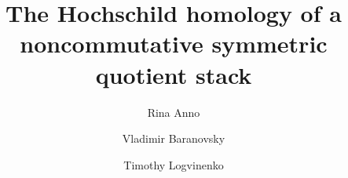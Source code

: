 \documentclass[12pt,a4paper,reqno]{amsart}
\title[Hochschild homology of nc symmetric quotient stack]{The Hochschild homology of a noncommutative symmetric quotient stack}
\author{Rina Anno}
\author{Vladimir Baranovsky}
\author{Timothy Logvinenko}
\DeclareMathOperator{\picr}{Pic}
\DeclareMathOperator{\cl}{Cl}
\DeclareMathOperator{\modd}{\bf Mod}
\DeclareMathOperator{\opp}{{opp}}
\begin{document}
\def\bv{\mathbf{v}}
\def\kgc_{K^*_G(\mathbb{C}^n)}
\def\kgchi_{K^*_\chi(\mathbb{C}^n)}
\def\kgcf_{K_G(\mathbb{C}^n)}
\def\kgchif_{K_\chi(\mathbb{C}^n)}
\def\gpic_{G\text{-}\picr}
\def\gcl_{G\text{-}\cl}
\def\trch_{{\chi_{0}}}
\def\regring{{R}}
\def\regrep{{V_{\text{reg}}}}
\def\givrep{{V_{\text{giv}}}}
\def\lbar{{(\mathbb{Z}^n)^\vee}}
\def\genpx_{{p_X}}
\def\genpy_{{p_Y}}
\def\genpcn_{p_{\mathbb{C}^n}}
\def\gnat{gnat}
\def\twalg{{\regring \rtimes G}}
\def\L{{\mathcal{L}}}
\def\gcd{\mbox{gcd}}
\def\lcm{\mbox{lcm}}
\def\tf{{\tilde{f}}}
\def\tD{{\tilde{D}}}
\def\A{{\mathcal{A}}}
\def\B{{\mathcal{B}}}
\def\C{{\mathcal{C}}}
\def\D{{\mathcal{D}}}
\def\F{{\mathcal{F}}}
\def\H{{\mathcal{H}}}
\def\L{{\mathcal{L}}}
\def\M{{\mathcal{M}}}
\def\N{{\mathcal{N}}}
\def\R{{\mathcal{R}}}
\def\T{{\mathcal{T}}}
\def\RF{{\mathcal{R}\mathcal{F}}}
\def\barA{{\bar{\mathcal{A}}}}
\def\barAi{{\bar{\mathcal{A}}_1}}
\def\barAj{{\bar{\mathcal{A}}_2}}
\def\barB{{\bar{\mathcal{B}}}}
\def\barC{{\bar{\mathcal{C}}}}
\def\barD{{\bar{\mathcal{D}}}}
\def\barT{{\bar{\mathcal{T}}}}
\def\barM{{\bar{\mathcal{M}}}}
\def\Aopp{{\A^{\opp}}}
\def\Bopp{{\B^{\opp}}}
\def\Copp{{\C^{\opp}}}
\def\aA{\leftidx{_{a}}{\A}}
\def\bA{\leftidx{_{b}}{\A}}
\def\Aa{{\A_a}}
\def\Ea{E_a}
\def\aE{\leftidx{_{a}}{E}{}}
\def\Eb{E_b}
\def\bE{\leftidx{_{b}}{E}{}}
\def\Fa{F_a}
\def\aF{\leftidx{_{a}}{F}{}}
\def\Fb{F_b}
\def\bF{\leftidx{_{b}}{F}{}}
\def\aM{\leftidx{_{a}}{M}{}}
\def\aN{\leftidx{_{a}}{N}{}}
\def\aMb{\leftidx{_{a}}{M}{_{b}}}
\def\aNb{\leftidx{_{a}}{N}{_{b}}}
\def\rfRFa{\leftidx{_{\RF}}{\RF}{_{\A}}}
\def\aRFrf{\leftidx{_{\A}}{\RF}{_{\RF}}}
\def\biAMA{\leftidx{_{\A}}{M}{_{\A}}}
\def\biAMC{\leftidx{_{\A}}{M}{_{\C}}}
\def\biCMA{\leftidx{_{\C}}{M}{_{\A}}}
\def\biCMC{\leftidx{_{\C}}{M}{_{\C}}}
\def\biALA{\leftidx{_{\A}}{L}{_{\A}}}
\def\biALC{\leftidx{_{\A}}{L}{_{\C}}}
\def\biCLA{\leftidx{_{\C}}{L}{_{\A}}}
\def\biCLC{\leftidx{_{\C}}{L}{_{\C}}}
\def\Na{{N_a}}
\def\modk{{\modd\text{-}\mathbb{k}}}
\def\Amod{{\A\text{-}\modd}}
\def\modA{{\modd\text{-}\A}}
\def\modbar{{\overline{\modd}}}
\def\modbarA{{\overline{\modd}\text{-}\A}}
\def\modbarAopp{{\overline{\modd}\text{-}\Aopp}}
\def\modB{{\modd\text{-}\B}}
\def\modC{{\modd\text{-}\C}}
\def\modD{{\modd\text{-}\D}}
\def\modbarB{{\overline{\modd}\text{-}\B}}
\def\modbarC{{\overline{\modd}\text{-}\C}}
\def\modbarD{{\overline{\modd}\text{-}\D}}
\def\modbarBopp{{\overline{\modd}\text{-}\Bopp}}
\def\AmodA{{\A\text{-}\modd\text{-}\A}}
\def\AmodM{{\A\text{-}\modd\text{-}\M}}
\def\AmodB{{\A\text{-}\modd\text{-}\B}}
\def\AmodT{{\A\text{-}\modd\text{-}\T}}
\def\BmodB{{\B\text{-}\modd\text{-}\B}}
\end{document}
